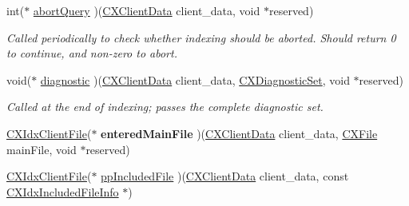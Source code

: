 \begin{DoxyCompactItemize}
\item 
\mbox{\label{structIndexerCallbacks_ace0bc034aefe283f15e2993aa8b19c2c}} 
int($\ast$ \hyperlink{structIndexerCallbacks_ace0bc034aefe283f15e2993aa8b19c2c}{abort\+Query} )(\hyperlink{group__CINDEX_gacfa40c3de26d228c0d898403c2c21612}{C\+X\+Client\+Data} client\+\_\+data, void $\ast$reserved)
\begin{DoxyCompactList}\small\item\em Called periodically to check whether indexing should be aborted. Should return 0 to continue, and non-\/zero to abort. \end{DoxyCompactList}\item 
\mbox{\label{structIndexerCallbacks_a042adb7450edd0f76d3f715d52c5b7ba}} 
void($\ast$ \hyperlink{structIndexerCallbacks_a042adb7450edd0f76d3f715d52c5b7ba}{diagnostic} )(\hyperlink{group__CINDEX_gacfa40c3de26d228c0d898403c2c21612}{C\+X\+Client\+Data} client\+\_\+data, \hyperlink{group__CINDEX__DIAG_ga38dfc0ae45b55bf7fd577eed9148e244}{C\+X\+Diagnostic\+Set}, void $\ast$reserved)
\begin{DoxyCompactList}\small\item\em Called at the end of indexing; passes the complete diagnostic set. \end{DoxyCompactList}\item 
\mbox{\label{structIndexerCallbacks_aaaf536b76953e8880fd5eaeb6182e296}} 
\hyperlink{group__CINDEX__HIGH_ga6fd9c59c0b0a0a21622e5bcfc08156cc}{C\+X\+Idx\+Client\+File}($\ast$ {\bfseries entered\+Main\+File} )(\hyperlink{group__CINDEX_gacfa40c3de26d228c0d898403c2c21612}{C\+X\+Client\+Data} client\+\_\+data, \hyperlink{group__CINDEX__FILES_gacfcea9c1239c916597e2e5b3e109215a}{C\+X\+File} main\+File, void $\ast$reserved)
\item 
\mbox{\label{structIndexerCallbacks_ae102dccc8b906641423c0ac66ec8f3e3}} 
\hyperlink{group__CINDEX__HIGH_ga6fd9c59c0b0a0a21622e5bcfc08156cc}{C\+X\+Idx\+Client\+File}($\ast$ \hyperlink{structIndexerCallbacks_ae102dccc8b906641423c0ac66ec8f3e3}{pp\+Included\+File} )(\hyperlink{group__CINDEX_gacfa40c3de26d228c0d898403c2c21612}{C\+X\+Client\+Data} client\+\_\+data, const \hyperlink{structCXIdxIncludedFileInfo}{C\+X\+Idx\+Included\+File\+Info} $\ast$)

\end{DoxyCompactItemize}
